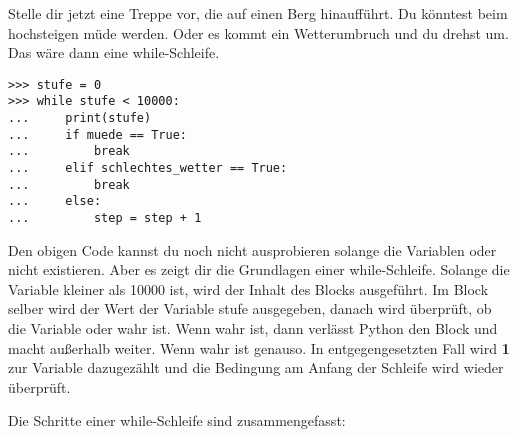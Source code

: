 Stelle dir jetzt eine Treppe vor, die auf einen Berg hinaufführt. Du könntest beim hochsteigen müde werden. Oder es kommt ein Wetterumbruch und du drehst um. Das wäre dann eine while-Schleife.

\begin{listingignore}
\begin{verbatim}
>>> stufe = 0
>>> while stufe < 10000:
...     print(stufe)
...     if muede == True:
...         break
...     elif schlechtes_wetter == True:
...         break
...     else:
...         step = step + 1
\end{verbatim}
\end{listingignore}

Den obigen Code kannst du noch nicht ausprobieren solange die Variablen  oder  nicht existieren. Aber es zeigt dir die Grundlagen einer while-Schleife. Solange die Variable  kleiner als 10000 ist, wird der Inhalt des Blocks ausgeführt. Im Block selber wird der Wert der Variable stufe ausgegeben, danach wird überprüft, ob die Variable  oder  wahr ist. Wenn  wahr ist, dann verlässt Python den Block und macht außerhalb weiter. Wenn  wahr ist genauso. In entgegengesetzten Fall wird \textbf{1} zur Variable  dazugezählt und die Bedingung am Anfang der Schleife wird wieder überprüft.
\par
\noindent
Die Schritte einer while-Schleife sind zusammengefasst:

